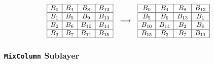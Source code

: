 \begin{equation}
    \begin{array}{c@{\quad \longrightarrow \quad}c}
        \begin{array}{|c|c|c|c|}
        \hline
        B_0 & B_4 & B_8 & B_{12} \\
        \hline
        B_1 & B_5 & B_9 & B_{13} \\
        \hline
        B_2 & B_6 & B_{10} & B_{14} \\
        \hline
        B_3 & B_7 & B_{11} & B_{15} \\
        \hline
        \end{array}
    &
    \begin{array}{|c|c|c|c|}
        \hline
        B_0 & B_4 & B_8 & B_{12} \\
        \hline
        B_5 & B_9 & B_{13} & B_1 \\
        \hline
        B_{10} & B_{14} & B_2 & B_6 \\
        \hline
        B_{15} & B_3 & B_7 & B_{11} \\
        \hline
        \end{array}
    \end{array}
\end{equation}





\subsubsection{\texttt{MixColumn} Sublayer}

